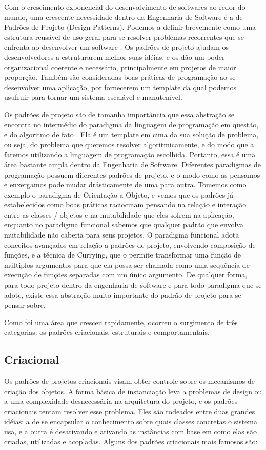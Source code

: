 Com o crescimento exponencial do desenvolvimento de softwares ao redor do mundo, uma crescente necessidade dentro da Engenharia de Software é a de Padrões de Projeto (Design Patterns). Podemos a definir brevemente como uma estrutura reusável de uso geral para se resolver problemas recorrentes que se enfrenta ao desenvolver um software \cite{gamma1995design}. Os padrões de projeto ajudam os desenvolvedores a estruturarem melhor suas idéias, e os dão um poder organizacional coerente e necessário, principalmente em projetos de maior proporção. Também são consideradas boas práticas de programação ao se desenvolver uma aplicação, por fornecerem um template da qual podemos usufruir para tornar um sistema escalável e manutenível.

Os padrões de projeto são de tamanha importância que essa abstração se encontra no intermédio do paradigma da linguagem de programação em questão, e do algoritmo de fato \cite{wikisoftwaredesign}. Ela é um template em cima da sua solução de problema, ou seja, do problema que queremos resolver algoritmicamente, e do modo que a faremos utilizando a linguagem de programação escolhida. Portanto, essa é uma área bastante ampla dentro da Engenharia de Software. Diferentes paradigmas de programação possuem diferentes padrões de projeto, e o modo como as pensamos e enxergamos pode mudar drásticamente de uma para outra. Tomemos como exemplo o paradigma de Orientação a Objeto, e vemos que os padrões já estabelecidos como boas práticas raciocinam pensando na relação e interação entre as classes / objetos e na mutabilidade que eles sofrem na aplicação, enquanto no paradigma funcional sabemos que qualquer padrão que envolva mutabilidade não caberia para seus projetos. O paradigma funcional adota conceitos avançados em relação a padrões de projeto, envolvendo composição de funções, e a técnica de Currying, que o permite transformar uma função de múltiplos argumentos para que ela possa ser chamada como uma sequência de execução de funções separadas com um único argumento. De qualquer forma, para todo projeto dentro da engenharia de software e para todo paradigma que se adote, existe essa abstração muito importante do padrão de projeto para se pensar sobre.

Como foi uma área que cresceu rapidamente, ocorreu o surgimento de três categorias: os padrões criacionais, estruturais e comportamentais.

\subsection{Criacional}
Os padrões de projetos criacionais visam obter controle sobre os mecanismos de criação dos objetos. A forma básica de instanciação leva a problemas de design ou a uma complexidade desnecessária na arquitetura do projeto, e os padrões criacionais tentam resolver esse problema. Eles são rodeados entre duas grandes idéias: a de se encapsular o conhecimento sobre quais classes concretas o sistema usa, e a outra é desativando e ativando as instâncias com base em como elas são criadas, utilizadas e acopladas. Alguns dos padrões criacionais mais famosos são:

